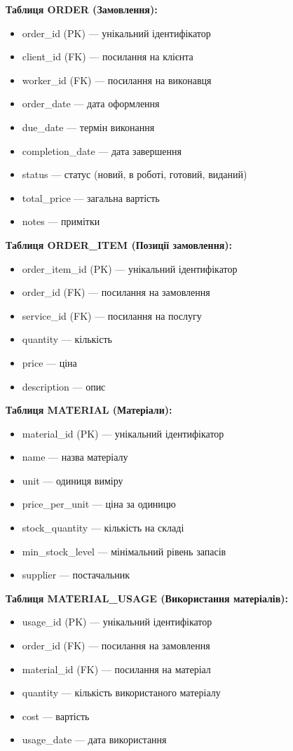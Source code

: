 \documentclass[14pt,a4paper]{extarticle}
\begin{document}
\textbf{Таблиця ORDER (Замовлення):}
\begin{itemize}
    \item order\_id (PK) --- унікальний ідентифікатор
    \item client\_id (FK) --- посилання на клієнта
    \item worker\_id (FK) --- посилання на виконавця
    \item order\_date --- дата оформлення
    \item due\_date --- термін виконання
    \item completion\_date --- дата завершення
    \item status --- статус (новий, в роботі, готовий, виданий)
    \item total\_price --- загальна вартість
    \item notes --- примітки
\end{itemize}

\textbf{Таблиця ORDER\_ITEM (Позиції замовлення):}
\begin{itemize}
    \item order\_item\_id (PK) --- унікальний ідентифікатор
    \item order\_id (FK) --- посилання на замовлення
    \item service\_id (FK) --- посилання на послугу
    \item quantity --- кількість
    \item price --- ціна
    \item description --- опис
\end{itemize}

\textbf{Таблиця MATERIAL (Матеріали):}
\begin{itemize}
    \item material\_id (PK) --- унікальний ідентифікатор
    \item name --- назва матеріалу
    \item unit --- одиниця виміру
    \item price\_per\_unit --- ціна за одиницю
    \item stock\_quantity --- кількість на складі
    \item min\_stock\_level --- мінімальний рівень запасів
    \item supplier --- постачальник
\end{itemize}

\textbf{Таблиця MATERIAL\_USAGE (Використання матеріалів):}
\begin{itemize}
    \item usage\_id (PK) --- унікальний ідентифікатор
    \item order\_id (FK) --- посилання на замовлення
    \item material\_id (FK) --- посилання на матеріал
    \item quantity --- кількість використаного матеріалу
    \item cost --- вартість
    \item usage\_date --- дата використання
\end{itemize}
\end{document}

